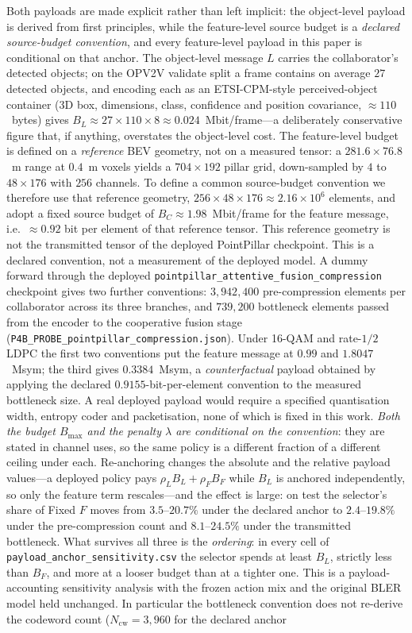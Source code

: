 \documentclass[journal]{IEEEtran}
\begin{document}
Both payloads are made explicit rather than left implicit: the object-level payload is derived from first principles, while the feature-level source budget is a \emph{declared source-budget convention}, and every feature-level payload in this paper is conditional on that anchor. The object-level message $L$ carries the collaborator's detected objects; on the OPV2V validate split a frame contains on average $27$ detected objects, and encoding each as an ETSI-CPM-style perceived-object container (3D box, dimensions, class, confidence and position covariance, ${\approx}110$~bytes) gives $B_L \approx 27 \times 110 \times 8 \approx 0.024$~Mbit/frame---a deliberately conservative figure that, if anything, overstates the object-level cost. The feature-level budget is defined on a \emph{reference} BEV geometry, not on a measured tensor: a $281.6 \times 76.8$~m range at $0.4$~m voxels yields a $704 \times 192$ pillar grid, down-sampled by $4$ to $48 \times 176$ with $256$ channels. To define a common source-budget convention we therefore use that reference geometry, $256 \times 48 \times 176 \approx 2.16\times10^{6}$ elements, and adopt a fixed source budget of $B_C \approx 1.98$~Mbit/frame for the feature message, i.e.\ ${\approx}0.92$ bit per element of that reference tensor. This reference geometry is not the transmitted tensor of the deployed PointPillar checkpoint. This is a declared convention, not a measurement of the deployed model. A dummy forward through the deployed \texttt{pointpillar\_attentive\_fusion\_compression} checkpoint gives two further conventions: $3{,}942{,}400$ pre-compression elements per collaborator across its three branches, and $739{,}200$ bottleneck elements passed from the encoder to the cooperative fusion stage (\texttt{P4B\_PROBE\_pointpillar\_compression.json}). Under 16-QAM and rate-$1/2$ LDPC the first two conventions put the feature message at $0.99$ and $1.8047$~Msym; the third gives $0.3384$~Msym, a \emph{counterfactual} payload obtained by applying the declared $0.9155$-bit-per-element convention to the measured bottleneck size. A real deployed payload would require a specified quantisation width, entropy coder and packetisation, none of which is fixed in this work. \emph{Both the budget $B_{\max}$ and the penalty $\lambda$ are conditional on the convention}: they are stated in channel uses, so the same policy is a different fraction of a different ceiling under each. Re-anchoring changes the absolute and the relative payload values---a deployed policy pays $\rho_L B_L + \rho_F B_F$ while $B_L$ is anchored independently, so only the feature term rescales---and the effect is large: on test the selector's share of Fixed $F$ moves from $3.5$--$20.7\%$ under the declared anchor to $2.4$--$19.8\%$ under the pre-compression count and $8.1$--$24.5\%$ under the transmitted bottleneck. What survives all three is the \emph{ordering}: in every cell of \texttt{payload\_anchor\_sensitivity.csv} the selector spends at least $B_L$, strictly less than $B_F$, and more at a looser budget than at a tighter one. This is a payload-accounting sensitivity analysis with the frozen action mix and the original BLER model held unchanged. In particular the bottleneck convention does not re-derive the codeword count ($N_{\mathrm{cw}}=3{,}960$ for the declared anchor 
\end{document}
